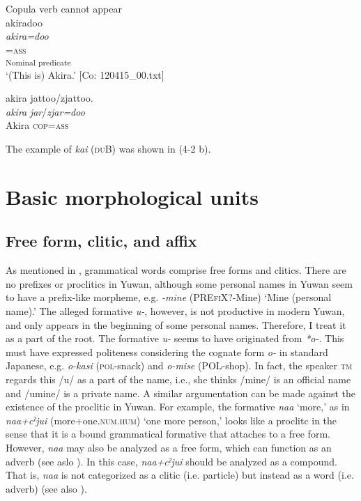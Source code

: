\ea  Copula verb cannot appear \label{ex:4.19}
\ea{}\\
\gllll   akiradoo\\
      \textit{akira=doo}\\
      [Akira]=\textsc{ass}\\
      [NP]\textsubscript{Nominal predicate}\\
      \glt       ‘(This is) Akira.’ [Co: 120415\_00.txt]

\ex  %
\glll *akira  jattoo/zjattoo.\\
      \textit{akira}  \textit{jar}/\textit{zjar=doo}\\
      Akira  \textsc{cop}=\textsc{ass}\\
\glt    [El: 111104]
\z
\z

The example of \textit{kai} (\textsc{du}B) was shown in (4-2 b).

\section{Basic morphological units}\label{sec:4.2}
\subsection{Free form, clitic, and affix}\label{sec:4.2.1}

As mentioned in , grammatical words comprise free forms and clitics. There are no prefixes or proclitics in Yuwan, although some personal names in Yuwan seem to have a prefix-like morpheme, e.g. \textit{-mine} (PRE\textsc{fi}X?-Mine) ‘Mine (personal name).’ The alleged formative \textit{u-}, however, is not productive in modern Yuwan, and only appears in the beginning of some personal names. Therefore, I treat it as a part of the root. The formative \textit{u-} seems to have originated from \textit{*o-}. This must have expressed politeness considering the cognate form \textit{o-} in standard Japanese, e.g. \textit{o-kasi} (\textsc{pol}-snack) and \textit{o-mise} (POL-shop). In fact, the speaker \textsc{tm} regards this /u/ as a part of the name, i.e., she thinks /mine/ is an official name and /umine/ is a private name. A similar argumentation can be made against the existence of the proclitic in Yuwan. For example, the formative \textit{naa} ‘more,’ as in \textit{naa+cˀjui} (more+one.\textsc{num}.\textsc{hum}) ‘one more person,’ looks like a proclitc in the sense that it is a bound grammatical formative that attaches to a free form. However, \textit{naa} may also be analyzed as a free form, which can function as an adverb (see aslo ). In this case, \textit{naa+cˀjui} should be analyzed as a compound. That is, \textit{naa} is not categorized as a clitic (i.e. particle) but instead as a word (i.e. adverb) (see also ).

